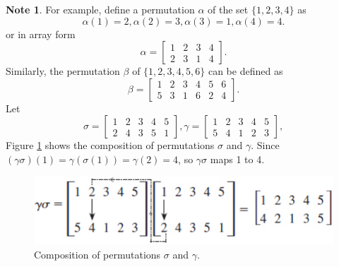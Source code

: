 \documentclass{article}
\theoremstyle{definition}
\newtheorem{note}{Note}[section]
\begin{document}
\begin{note}
    For example, define a permutation $\alpha$ of the set $\{1,2,3,4\}$ as
\begin{equation*}
    \alpha(1) = 2, \alpha(2) = 3, \alpha(3) = 1, \alpha(4)=4.
\end{equation*}
or in array form
\begin{equation*}
    \alpha = 
    \begin{bmatrix}  
        1 & 2 & 3 & 4 \\
        2 & 3 & 1 & 4
    \end{bmatrix}.
\end{equation*}
Similarly, the permutation $\beta$ of $\{1,2,3,4,5,6\}$ can be defined as
\begin{equation*}
    \beta =
    \begin{bmatrix}
        1 & 2 & 3 & 4 & 5 & 6 \\
        5 & 3 & 1 & 6 & 2 & 4
    \end{bmatrix}.
\end{equation*}
Let 
\begin{equation*}
    \sigma =
    \begin{bmatrix}
        1 & 2 & 3 & 4 & 5 \\
        2 & 4 & 3 & 5 & 1
    \end{bmatrix},
    \gamma =
    \begin{bmatrix}
        1 & 2 & 3 & 4 & 5 \\
        5 & 4 & 1 & 2 & 3
    \end{bmatrix},
\end{equation*}
Figure \ref{composition_permutation} shows the composition of permutations $\sigma$ and $\gamma$. Since $(\gamma\sigma)(1)=\gamma(\sigma(1)) = \gamma(2) = 4$, so $\gamma\sigma$ maps 1 to 4.
\end{note}
\begin{figure}[!htbp]
    \centering
    \includegraphics[width=0.7\linewidth]{figures/composition_permutation.png}
    \caption{Composition of permutations $\sigma$ and $\gamma$.}
    \label{composition_permutation}
\end{figure}
\end{document}
